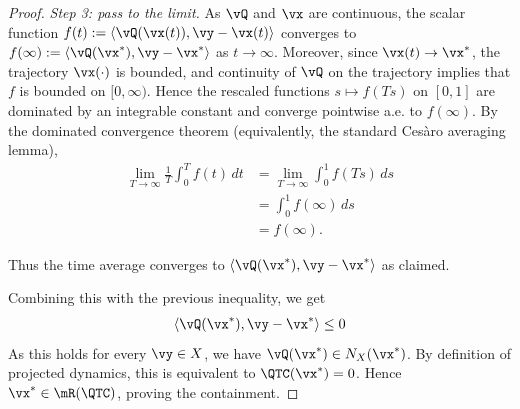 \begin{proof}
\emph{Step 3: pass to the limit.}
As \(\vQ\) and \(\vx\) are continuous, the scalar function
\(f(t):=\langle \vQ(\vx(t)),\vy-\vx(t)\rangle\) converges to
\(f(\infty):=\langle \vQ(\vx^*),\vy-\vx^*\rangle\) as \(t\to\infty\).
Moreover, since \(\vx(t)\to\vx^*\), the trajectory \(\vx(\cdot)\) is bounded,
and continuity of \(\vQ\) on the trajectory implies that \(f\) is bounded on
$[0,\infty)$. Hence the rescaled functions $s\mapsto f(Ts)$ on $[0,1]$ are
dominated by an integrable constant and converge pointwise a.e. to $f(\infty)$.
By the dominated convergence theorem (equivalently, the standard Ces\`aro averaging
lemma),
\begin{align*}
\lim_{T\to\infty}\frac{1}{T}\int_0^T f(t)\,dt
    &=\lim_{T\to\infty}\int_0^1 f(Ts)\,ds \\
    &=\int_0^1 f(\infty)\,ds \\
    &=f(\infty).
\end{align*}

Thus the time average converges to \(\langle \vQ(\vx^*),\vy-\vx^*\rangle\) as claimed.

Combining this with the previous inequality, we get
\begin{align*}
\langle \vQ(\vx^*),\vy-\vx^*\rangle \leq 0
\end{align*}
As this holds for every $\vy\in X$, we have
$\vQ(\vx^*) \in N_X(\vx^*)$. By definition of projected dynamics, this is
equivalent to $\QTC(\vx^*)=0$. Hence $\vx^* \in \mR(\QTC)$, proving the
containment.
\end{proof}
